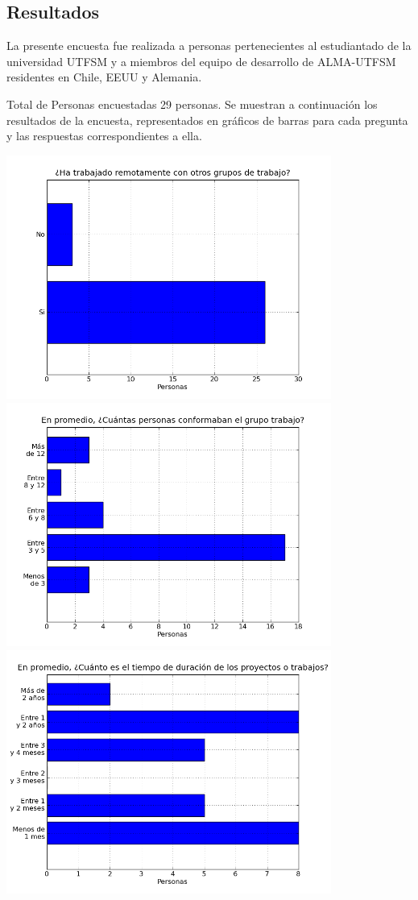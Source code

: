 \subsection{Resultados}
La presente encuesta fue realizada a personas pertenecientes al estudiantado
de la universidad UTFSM y a miembros del equipo de desarrollo de ALMA-UTFSM
residentes en Chile, EEUU y Alemania.

Total de Personas encuestadas 29 personas.
Se muestran a continuación los resultados de la encuesta, representados en
gráficos de barras para cada pregunta y las respuestas correspondientes a
ella.

\begin{center}
	\includegraphics[width=0.8\textwidth]{images/fig1}\\
	\includegraphics[width=0.8\textwidth]{images/fig2}\\
	\includegraphics[width=0.8\textwidth]{images/fig3}\\

\end{center}
